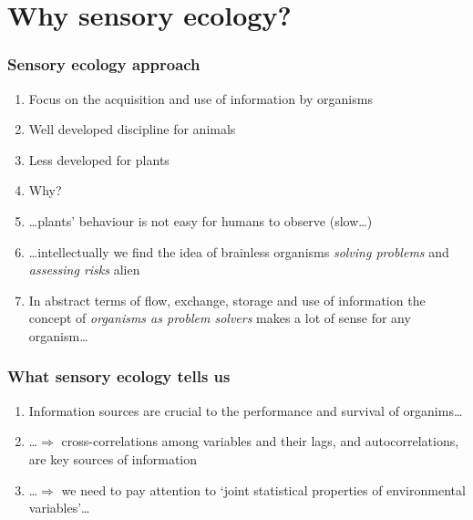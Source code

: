 \documentclass[utf8]{beamer}\usepackage[]{graphicx}\usepackage[]{color} %
\begin{document}


\section{Why sensory ecology?}

\begin{frame}[<+->]
\frametitle{Sensory ecology approach}
\begin{enumerate}
  \item Focus on the acquisition and use of information by organisms
  \item Well developed discipline for animals
  \item Less developed for plants
  \item Why?
  \item \ldots plants' behaviour is not easy for humans to observe (slow\ldots)
  \item \ldots intellectually we find the idea of brainless organisms \emph{solving problems} and \emph{assessing risks} alien
  \item In abstract terms of flow, exchange, storage and use of information the concept of \emph{organisms as problem solvers} makes a lot of sense for any organism\ldots
\end{enumerate}
\end{frame}

\begin{frame}[<+->]
\frametitle{What sensory ecology tells us}
\begin{enumerate}
  \item Information sources are crucial to the performance and survival of organims\ldots
  \item \ldots $\Rightarrow$ cross-correlations among variables and their lags, and autocorrelations, are key sources of information
  \item \ldots $\Rightarrow$ we need to pay attention to `joint statistical properties of environmental variables'\ldots
\end{enumerate}
\end{frame}
\end{document}
